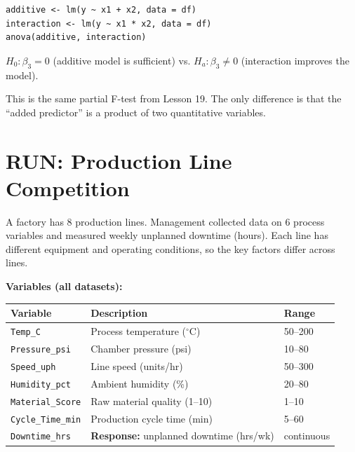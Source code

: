 \documentclass[12pt]{article}
\begin{document}
\begin{verbatim}
additive <- lm(y ~ x1 + x2, data = df)
interaction <- lm(y ~ x1 * x2, data = df)
anova(additive, interaction)
\end{verbatim}

\noindent
$H_0\!: \beta_3 = 0$ (additive model is sufficient) vs. $H_a\!: \beta_3 \neq 0$ (interaction improves the model).

\vspace{0.3cm}

\noindent
This is the same partial F-test from Lesson 19. The only difference is that the ``added predictor'' is a product of two quantitative variables.

\newpage
\section*{RUN: Production Line Competition}

\noindent
A factory has 8 production lines. Management collected data on 6 process variables and measured weekly unplanned downtime (hours). Each line has different equipment and operating conditions, so the key factors differ across lines.

\vspace{0.3cm}

\noindent
\textbf{Variables (all datasets):}

\begingroup
\setlength{\tabcolsep}{4pt}
\renewcommand{\arraystretch}{1.3}
\begin{table}[ht]
\centering
\begin{tabularx}{0.95\textwidth}{|l|X|l|}
    \hline
    \textbf{Variable} & \textbf{Description} & \textbf{Range} \\ \hline
    \texttt{Temp\_C} & Process temperature (${}^\circ$C) & 50--200 \\ \hline
    \texttt{Pressure\_psi} & Chamber pressure (psi) & 10--80 \\ \hline
    \texttt{Speed\_uph} & Line speed (units/hr) & 50--300 \\ \hline
    \texttt{Humidity\_pct} & Ambient humidity (\%) & 20--80 \\ \hline
    \texttt{Material\_Score} & Raw material quality (1--10) & 1--10 \\ \hline
    \texttt{Cycle\_Time\_min} & Production cycle time (min) & 5--60 \\ \hline
    \texttt{Downtime\_hrs} & \textbf{Response:} unplanned downtime (hrs/wk) & continuous \\ \hline
\end{tabularx}
\end{table}
\endgroup
\end{document}
